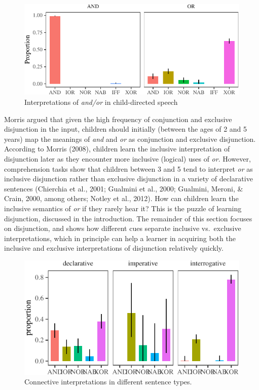 \documentclass[floatsintext,man]{apa6}
\theoremstyle{definition}
\theoremstyle{definition}
\theoremstyle{definition}
\theoremstyle{remark}
\begin{document}
\begin{figure}[tb]

{\centering \includegraphics{figs/connectivePlot-1} 

}

\caption{Interpretations of \textit{and/or} in child-directed speech}\label{fig:connectivePlot}
\end{figure}

Morris argued that given the high frequency of conjunction and exclusive
disjunction in the input, children should initially (between the ages of
2 and 5 years) map the meanings of \emph{and} and \emph{or} as
conjunction and exclusive disjunction. According to Morris (2008),
children learn the inclusive interpretation of disjunction later as they
encounter more inclusive (logical) uses of \emph{or}. However,
comprehension tasks show that children between 3 and 5 tend to interpret
\emph{or} as inclusive disjunction rather than exclusive disjunction in
a variety of declarative sentences (Chierchia et al., 2001; Gualmini et
al., 2000; Gualmini, Meroni, \& Crain, 2000, among others; Notley et
al., 2012). How can children learn the inclusive semantics of \emph{or}
if they rarely hear it? This is the puzzle of learning disjunction,
discussed in the introduction. The remainder of this section focuses on
disjunction, and shows how different cues separate inclusive
vs.~exclusive interpretations, which in principle can help a learner in
acquiring both the inclusive and exclusive interpretations of
disjunction relatively quickly.

\begin{figure}[tb]

{\centering \includegraphics{figs/utterancetypePlot-1} 

}

\caption{Connective interpretations in different sentence types.}\label{fig:utterancetypePlot}
\end{figure}
\end{document}

